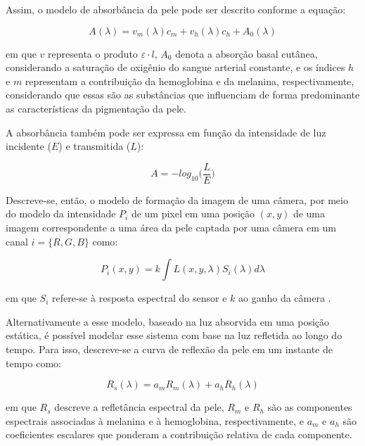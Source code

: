 Assim, o modelo de absorbância da pele pode ser descrito conforme a equação:

\begin{equation}
\label{eq:absorb-beerlamb}
    A(\lambda) = v_m(\lambda)c_m + v_h(\lambda)c_h + A_0(\lambda)
\end{equation}

em que \(v\) representa o produto \(\varepsilon \cdot l\), \(A_0\) denota a absorção basal cutânea, considerando a saturação de oxigênio do sangue arterial constante, e os índices \(h\) e \(m\) representam a contribuição da hemoglobina e da melanina, respectivamente, considerando que essas são as substâncias que influenciam de forma predominante as características da pigmentação da pele. 

A absorbância também pode ser expressa em função da intensidade de luz incidente (\(E\)) e transmitida (\(L\)): 

\begin{equation}
    A = - log_{10}\Big (\frac{L}{E} \Big )
\end{equation}

Descreve-se, então, o modelo de formação da imagem de uma câmera, por meio do modelo da intensidade \( P_i \) de um pixel em uma posição \((x, y)\) de uma imagem correspondente a uma área da pele captada por uma câmera em um canal \(i= \{R, G, B \}\) como:

\begin{equation}
    \label{eq:Pi-beerlambert}
    P_i(x, y) = k \int L(x, y, \lambda) S_i(\lambda) d \lambda
\end{equation}

em que \(S_i\) refere-se à resposta espectral do sensor e \(k\) ao ganho da câmera \cite{xu2014robust}. 

Alternativamente a esse modelo, baseado na luz absorvida em uma posição estática, é possível modelar esse sistema com base na luz refletida ao longo do tempo. Para isso, descreve-se a curva de reflexão da pele em um instante de tempo como:

\begin{equation}
    \label{eq:Rs}
    R_s(\lambda) = a_m R_m(\lambda) + a_h R_h(\lambda)
\end{equation}

em que \(R_s\) descreve a refletância espectral da pele, \(R_m\) e \(R_h\) são as componentes espectrais associadas à melanina e à hemoglobina, respectivamente, e \(a_m\) e \(a_h\) são coeficientes escalares que ponderam a contribuição relativa de cada componente.

